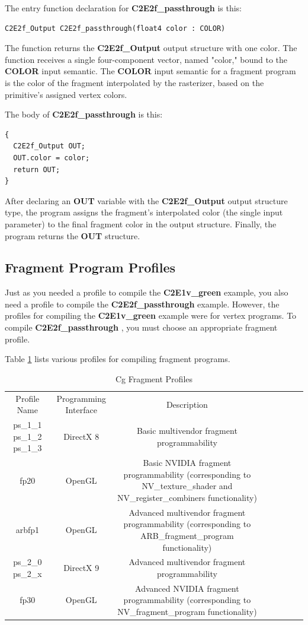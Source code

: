 \documentclass{book}
\begin{document}
The entry function declaration for \textbf{C2E2f\_passthrough} is this:

\FloatBarrier
\begin{lstlisting}
C2E2f_Output C2E2f_passthrough(float4 color : COLOR)
\end{lstlisting}
\FloatBarrier

The function returns the \textbf{C2E2f\_Output} output structure with one color. The function receives a single four-component vector, named "color," bound to the \textbf{COLOR} input semantic. The \textbf{COLOR} input semantic for a fragment program is the color of the fragment interpolated by the rasterizer, based on the primitive's assigned vertex colors.

The body of \textbf{C2E2f\_passthrough} is this:

\FloatBarrier
\begin{lstlisting}
{
  C2E2f_Output OUT;
  OUT.color = color;
  return OUT;
}
\end{lstlisting}
\FloatBarrier

After declaring an \textbf{OUT} variable with the \textbf{C2E2f\_Output} output structure type, the program assigns the fragment's interpolated color (the single input parameter) to the final fragment color in the output structure. Finally, the program returns the \textbf{OUT} structure.

\subsection{Fragment Program Profiles}

Just as you needed a profile to compile the \textbf{C2E1v\_green} example, you also need a profile to compile the \textbf{C2E2f\_passthrough} example. However, the profiles for compiling the \textbf{C2E1v\_green} example were for vertex programs. To compile \textbf{C2E2f\_passthrough} , you must choose an appropriate fragment profile.

Table \ref{table:2-2} lists various profiles for compiling fragment programs.

\begin{table}
\centering
\begin{tabular}{ |c|c|c|c|c|c|c|c| } 
 \hline
Profile Name & Programming Interface & Description \\
ps\_1\_1 ps\_1\_2 ps\_1\_3 & DirectX 8 & Basic multivendor fragment programmability \\
fp20 & OpenGL & Basic NVIDIA fragment programmability (corresponding to NV\_texture\_shader and NV\_register\_combiners functionality) \\
arbfp1 & OpenGL & Advanced multivendor fragment programmability (corresponding to ARB\_fragment\_program functionality) \\
ps\_2\_0 ps\_2\_x & DirectX 9 & Advanced multivendor fragment programmability \\
fp30 & OpenGL & Advanced NVIDIA fragment programmability (corresponding to NV\_fragment\_program functionality) \\
 \hline
\end{tabular}
\caption{Cg Fragment Profiles}
\label{table:2-2}
\end{table}
\end{document}
